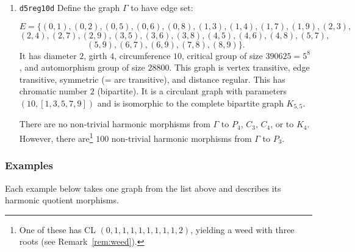 \documentclass[12pt,letterpaper]{article}
\theoremstyle{definition}
\begin{document}
\begin{enumerate}
There are $10$ non-trivial harmonic morphisms from $\Gamma$ to $P_3$
and $60$ non-trivial harmonic morphisms from $\Gamma$ to $C_3$.
However, there are
no non-trivial harmonic morphisms from $\Gamma$ to $P_4$, $C_4$, or to $K_4$.


\item
  {\tt d5reg10d}\newline
  Define the graph  $\Gamma$
to have edge set:

\[
E = \{
(0, 1), (0, 2), (0, 5), (0, 6), (0, 8), (1, 3), (1, 4), (1, 7), (1, 9), (2, 3),
\]
\[
(2, 4), (2, 7), (2, 9), (3, 5), (3, 6), (3, 8), (4, 5), (4, 6), (4, 8), (5, 7),
\]
\[
(5, 9), (6, 7), (6, 9), (7, 8), (8, 9)
\}.
\]
It has diameter $2$,
girth $4$, circumference $10$, 
critical group of size $390625 = 5^8$, 
and automorphism group of size $28800$.
This graph is vertex transitive, edge transitive,
symmetric (= arc transitive), and distance regular.
This has chromatic number $2$ (bipartite).
It is a circulant graph with parameters $(10, [1, 3, 5, 7, 9])$
and is isomorphic to the complete bipartite graph $K_{5,5}$.

There are no non-trivial harmonic morphisms from $\Gamma$ to
$P_4$, $C_3$, $C_4$, or to $K_4$. However, there
are\footnote{One of these has CL $(0, 1, 1, 1, 1, 1, 1, 1, 1, 2)$,
yielding a weed with three roots (see Remark~\ref{rem:weed}).}
$100$ non-trivial harmonic morphisms from $\Gamma$ to $P_3$.

\end{enumerate}


\subsubsection{Examples}

Each example below takes one graph from the list above and describes
its harmonic quotient morphisms.
\end{document}
